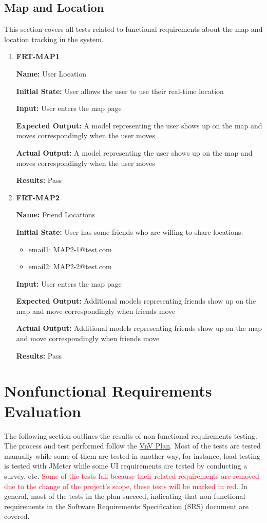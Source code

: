 \documentclass[12pt, titlepage]{article}
\begin{document}
\subsection{Map and Location}
This section covers all tests related to functional requirements about the map and location tracking in the system.
\begin{enumerate}
\item \textbf{FRT-MAP1}

\textbf{Name:} User Location

\textbf{Initial State:} User allows the user to use their real-time location

\textbf{Input:} User enters the map page
					
\textbf{Expected Output:} A model representing the user shows up on the map and moves correspondingly when the user moves

\textbf{Actual Output:} A model representing the user shows up on the map and moves correspondingly when the user moves

\textbf{Results:} Pass

\item \textbf{FRT-MAP2}

\textbf{Name:} Friend Locations

\textbf{Initial State:} User has some friends who are willing to share locations:
\begin{itemize}
\item email1: MAP2-1@test.com
\item email2: MAP2-2@test.com
\end{itemize}

\textbf{Input:} User enters the map page
					
\textbf{Expected Output:} Additional models representing friends show up on the map and move correspondingly when friends move

\textbf{Actual Output:} Additional models representing friends show up on the map and move correspondingly when friends move

\textbf{Results:} Pass
\end{enumerate}

\section{Nonfunctional Requirements Evaluation}
The following section outlines the results of non-functional requirements testing. The process and test performed follow the \href{https://github.com/beatlepie/4G06CapstoneProjectTeam2/blob/main/docs/VnVPlan/VnVPlan.pdf}{VnV Plan}. Most of the tests are tested manually while some of them are tested in another way, for instance, load testing is tested with JMeter while some UI requirements are tested by conducting a survey, etc. \textcolor{red}{Some of the tests fail because their related requirements are removed due to the change of the project's scope, these tests will be marked in red.} In general, most of the tests in the plan succeed, indicating that non-functional requirements in the Software Requirements Specification (SRS) document are covered.
\end{document}
